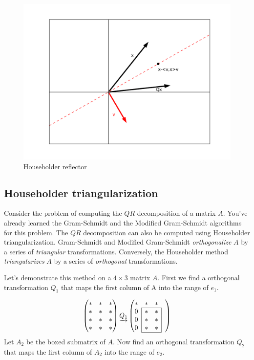 \begin{figure}
	\centering
	\includegraphics[width= \textwidth]{fig1}
	\caption{Householder reflector}
	\label{fig:Householder reflector}
\end{figure}

\subsection*{Householder triangularization}
Consider the problem of computing the $QR$ decomposition of a matrix $A$. You've already learned the Gram-Schmidt and the Modified Gram-Schmidt algorithms for this problem. The $QR$ decomposition can also be computed using Householder triangularization. Gram-Schmidt and Modified Gram-Schmidt \emph{orthogonalize} $A$ by a series of \emph{triangular} transformations. Conversely, the Householder method \emph{triangularizes} $A$ by a series of \emph{orthogonal} transformations.

Let's demonstrate this method on a $4 \times 3$ matrix $A$. First we find a orthogonal transformation $Q_1$ that maps the first column of A into the range of $e_1$.

\def\mc#1{\multicolumn{1}{c|}{#1}}
\begin{equation*}
\begin{pmatrix}
\ast & \ast & \ast \\
\ast & \ast & \ast \\
\ast & \ast & \ast \\
\ast & \ast & \ast 
\end{pmatrix}
\underrightarrow{Q_1}
\begin{pmatrix}

\ast & \ast & \ast & \\ \cline{2-3}
\mc{0} & \ast & \mc{\ast}& \\
\mc{0} & \ast & \mc{\ast} & \\
\mc{0}& \ast & \mc{\ast} & \\ \cline{2-3}
\end{pmatrix}
\end{equation*}
Let $A_2$ be the boxed submatrix of $A$. Now find an orthogonal transformation $Q_2$ that maps the first column of $A_2$ into the range of $e_2$. 

